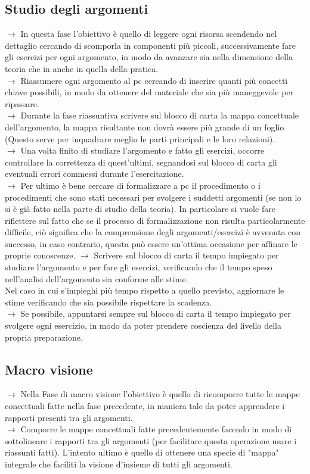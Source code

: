 \documentclass[11pt,a4paper]{article}
\begin{document}
\subsection{Studio degli argomenti}
$\rightarrow$ In questa fase l'obiettivo è quello di leggere ogni risorsa scendendo nel dettaglio cercando di scomporla in componenti più piccoli, successivamente fare gli esercizi per ogni argomento, in modo da avanzare sia nella dimensione della teoria che in anche in quella della pratica.\\
$\rightarrow$ Riassumere ogni argomento al pc cercando di inserire quanti più concetti chiave possibili, in modo da ottenere del materiale che sia più maneggevole per ripassare.\\
$\rightarrow$ Durante la fase riassuntiva scrivere sul blocco di carta la mappa concettuale dell'argomento, la mappa risultante non dovrà essere più grande di un foglio (Questo serve per inquadrare meglio le parti principali e le loro relazioni).\\
$\rightarrow$ Una volta finito di studiare l'argomento e fatto gli esercizi, occorre controllare la correttezza di quest'ultimi, segnandosi sul blocco di carta gli eventuali errori commessi durante l'esercitazione.\\
$\rightarrow$ Per ultimo è bene cercare di formalizzare a pc il procedimento o i procedimenti che sono stati necessari per svolgere i suddetti argomenti (se non lo si è già fatto nella parte di studio della teoria). In particolare si vuole fare riflettere sul fatto che se il processo di formalizzazione non risulta particolarmente difficile, ciò significa che la comprensione degli argomenti/esercizi è avvenuta con successo, in caso contrario, questa può essere un'ottima occasione per affinare le proprie conoscenze.
$\rightarrow$ Scrivere sul blocco di carta il tempo impiegato per studiare l'argomento e per fare gli esercizi, verificando che il tempo speso nell'analisi dell'argomento sia conforme alle stime.\\
Nel caso in cui s'impieghi più tempo rispetto a quello previsto, aggiornare le stime verificando che sia possibile rispettare la scadenza.\\
$\rightarrow$ Se possibile, appuntarsi sempre sul blocco di carta il tempo impiegato per svolgere ogni esercizio, in modo da poter prendere coscienza del livello della propria preparazione.\\

\subsection{Macro visione}
$\rightarrow$ Nella Fase di macro visione l'obiettivo è quello di ricomporre tutte le mappe concettuali fatte nella fase precedente, in maniera tale da poter apprendere i rapporti presenti tra gli argomenti.\\
$\rightarrow$ Comporre le mappe concettuali fatte precedentemente facendo in modo di sottolineare i rapporti tra gli argomenti (per facilitare questa operazione usare i riassunti fatti). L'intento ultimo è quello di ottenere una specie di "mappa" integrale che faciliti la visione d'insieme di tutti gli argomenti. \\
\end{document}
